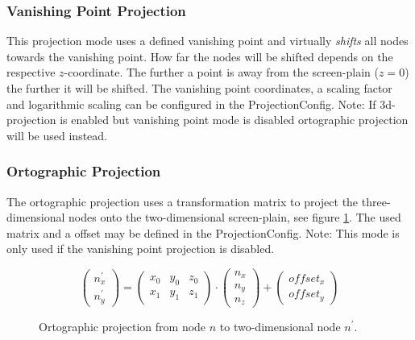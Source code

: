 \subsubsection{Vanishing Point Projection}
This projection mode uses a defined vanishing point and virtually \emph{shifts} all nodes towards the vanishing point. How far the nodes will be shifted depends on the respective $z$-coordinate. The further a point is away from the screen-plain ($z=0$) the further it will be shifted. The vanishing point coordinates, a scaling factor and logarithmic scaling can be configured in the ProjectionConfig. Note: If 3d-projection is enabled but vanishing point mode is disabled ortographic projection will be used instead.

\subsubsection{Ortographic Projection}
The ortographic projection uses a transformation matrix to project the three-dimensional nodes onto the two-dimensional screen-plain, see figure \ref{math:orthographicProjection}. The used matrix and a offset may be defined in the ProjectionConfig. Note: This mode is only used if the vanishing point projection is disabled.

\begin{figure} [h]
\[
\left(
\begin{array}{c}
n_{x}^{'} \\
n_{y}^{'}
\end{array}
\right)
%
=
%
\left(
\begin{array}{ccc}
x_0 & y_0 & z_0 \\
x_1 & y_1 & z_1
\end{array}
\right)
\cdot
\left(
\begin{array}{c}
n_x  \\
n_y  \\
n_z
\end{array}
\right)
%
+
%
\left(
\begin{array}{c}
offset_x \\
offset_y
\end{array}
\right)
\]
\caption{Ortographic projection from node $n$ to two-dimensional node $n^{'}$.}
\label{math:orthographicProjection}
\end{figure}

